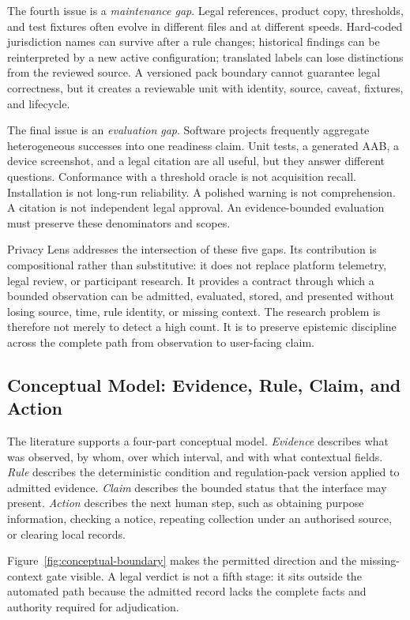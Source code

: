 The fourth issue is a \emph{maintenance gap}. Legal references, product copy, thresholds, and test fixtures often evolve in different files and at different speeds. Hard-coded jurisdiction names can survive after a rule changes; historical findings can be reinterpreted by a new active configuration; translated labels can lose distinctions from the reviewed source. A versioned pack boundary cannot guarantee legal correctness, but it creates a reviewable unit with identity, source, caveat, fixtures, and lifecycle.

The final issue is an \emph{evaluation gap}. Software projects frequently aggregate heterogeneous successes into one readiness claim. Unit tests, a generated AAB, a device screenshot, and a legal citation are all useful, but they answer different questions. Conformance with a threshold oracle is not acquisition recall. Installation is not long-run reliability. A polished warning is not comprehension. A citation is not independent legal approval. An evidence-bounded evaluation must preserve these denominators and scopes.

Privacy Lens addresses the intersection of these five gaps. Its contribution is compositional rather than substitutive: it does not replace platform telemetry, legal review, or participant research. It provides a contract through which a bounded observation can be admitted, evaluated, stored, and presented without losing source, time, rule identity, or missing context. The research problem is therefore not merely to detect a high count. It is to preserve epistemic discipline across the complete path from observation to user-facing claim.

\subsection{Conceptual Model: Evidence, Rule, Claim, and Action}

The literature supports a four-part conceptual model. \emph{Evidence} describes what was observed, by whom, over which interval, and with what contextual fields. \emph{Rule} describes the deterministic condition and regulation-pack version applied to admitted evidence. \emph{Claim} describes the bounded status that the interface may present. \emph{Action} describes the next human step, such as obtaining purpose information, checking a notice, repeating collection under an authorised source, or clearing local records.

Figure~\ref{fig:conceptual-boundary} makes the permitted direction and the missing-context gate visible. A legal verdict is not a fifth stage: it sits outside the automated path because the admitted record lacks the complete facts and authority required for adjudication.

